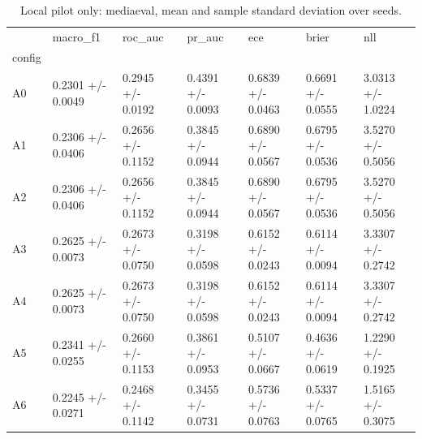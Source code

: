 \begin{table}
\caption{Local pilot only: mediaeval, mean and sample standard deviation over seeds.}
\label{tab:pilot_mediaeval}
\begin{tabular}{lllllll}
\toprule
 & macro\_f1 & roc\_auc & pr\_auc & ece & brier & nll \\
config &  &  &  &  &  &  \\
\midrule
A0 & 0.2301 +/- 0.0049 & 0.2945 +/- 0.0192 & 0.4391 +/- 0.0093 & 0.6839 +/- 0.0463 & 0.6691 +/- 0.0555 & 3.0313 +/- 1.0224 \\
A1 & 0.2306 +/- 0.0406 & 0.2656 +/- 0.1152 & 0.3845 +/- 0.0944 & 0.6890 +/- 0.0567 & 0.6795 +/- 0.0536 & 3.5270 +/- 0.5056 \\
A2 & 0.2306 +/- 0.0406 & 0.2656 +/- 0.1152 & 0.3845 +/- 0.0944 & 0.6890 +/- 0.0567 & 0.6795 +/- 0.0536 & 3.5270 +/- 0.5056 \\
A3 & 0.2625 +/- 0.0073 & 0.2673 +/- 0.0750 & 0.3198 +/- 0.0598 & 0.6152 +/- 0.0243 & 0.6114 +/- 0.0094 & 3.3307 +/- 0.2742 \\
A4 & 0.2625 +/- 0.0073 & 0.2673 +/- 0.0750 & 0.3198 +/- 0.0598 & 0.6152 +/- 0.0243 & 0.6114 +/- 0.0094 & 3.3307 +/- 0.2742 \\
A5 & 0.2341 +/- 0.0255 & 0.2660 +/- 0.1153 & 0.3861 +/- 0.0953 & 0.5107 +/- 0.0667 & 0.4636 +/- 0.0619 & 1.2290 +/- 0.1925 \\
A6 & 0.2245 +/- 0.0271 & 0.2468 +/- 0.1142 & 0.3455 +/- 0.0731 & 0.5736 +/- 0.0763 & 0.5337 +/- 0.0765 & 1.5165 +/- 0.3075 \\
\bottomrule
\end{tabular}
\end{table}
